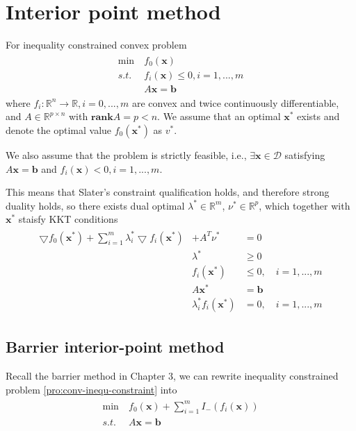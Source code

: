 \section{Interior point method}
For inequality constrained convex problem
\begin{align}
    \begin{array}{lll}
        \min \ &f_0(\mathbf{x}) \\
        s.t. \ &f_i(\mathbf{x}) \leq 0, i = 1,..., m \\
         &A\mathbf{x} = \mathbf{b}
    \end{array}
    \label{pro:conv-inequ-constraint}
\end{align}
where $f_i: \mathbb{R}^n \rightarrow \mathbb{R}, i=0,..., m$ are
convex and twice continuously differentiable, and
$A \in \mathbb{R}^{p\times n}$ with $\mathbf{rank}A = p < n$.
We assume that an optimal $\mathbf{x}^*$ exists and denote the optimal
value $f_0(\mathbf{x}^*)$ as $v^*$.
\par
We also assume that the problem is strictly feasible, i.e.,
$\exists \mathbf{x} \in \mathcal{D}$ satisfying
$A\mathbf{x} = \mathbf{b}$ and $f_i(\mathbf{x}) < 0, i=1,...,m$.
\par
This means that Slater's constraint qualification holds,
and therefore strong duality holds, so there exists dual
optimal $\lambda^* \in \mathbb{R}^m$, $\nu^* \in \mathbb{R}^p$,
which together with $\mathbf{x}^*$ staisfy KKT conditions
\begin{align}
    \begin{array}{lllll}
        \bigtriangledown f_0(\mathbf{x}^*) + \sum_{i=1}^m \lambda^*_i
        \bigtriangledown f_i(\mathbf{x}^*)& + A^T \nu^* &= 0 \\
        &\lambda^* &\geq 0 \\
        &f_i(\mathbf{x}^*) &\leq 0, \quad i = 1,...,m \\
        &A\mathbf{x}^* &= \mathbf{b} \\
        &\lambda^*_if_i(\mathbf{x}^*) &= 0, \quad i = 1,...,m
    \end{array}
\end{align}

\subsection{Barrier interior-point method}
Recall the barrier method in Chapter 3, we can
rewrite inequality constrained problem \ref{pro:conv-inequ-constraint}
into
\begin{align}
    \begin{array}{ll}
        \min \ &f_0(\mathbf{x}) + \sum_{i=1}^m I_{-}(f_i(\mathbf{x})) \\
        s.t. \ &A\mathbf{x} = \mathbf{b}
    \end{array}
    \label{pro:conv-inequ-barrier1}
\end{align}

